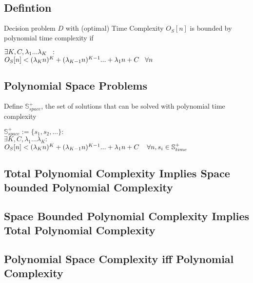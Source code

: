 \documentclass[11pt]{article}
\begin{document}
\subsection{Defintion}
Decision problem $D$ with (optimal) Time Complexity $O_S[n]$ is bounded by polynomial time complexity if
\begin{center}
$\exists K,C,\lambda_1...\lambda_K \hspace{2mm} :$
\\ \vspace{2mm}
$O_S[n] < (\lambda_K n)^K + (\lambda_{K-1} n)^{K-1}... + \lambda_1 n + C \hspace{3mm} \forall n$
\end{center}







\subsection{Polynomial Space Problems}
Define $\mathbb{S}^+_{space}$, the set of solutions that can be solved with polynomial time complexity
\begin{center}
$
\mathbb{S}^+_{space} := \{s_1,s_2,...\} : 
$
\\
$
\exists K,C,\lambda_1...\lambda_K : 
$
\\
$
O_S[n] < (\lambda_K n)^K + (\lambda_{K-1} n)^{K-1}... + \lambda_1 n + C \hspace{4mm} \forall n, s_i \in \mathbb{S}^+_{time}
$
\end{center}







\subsection{Total Polynomial Complexity Implies Space bounded Polynomial Complexity}
\subsection{Space Bounded Polynomial Complexity Implies Total Polynomial Complexity}
\subsection{Polynomial Space Complexity iff Polynomial Complexity}
\end{document}
